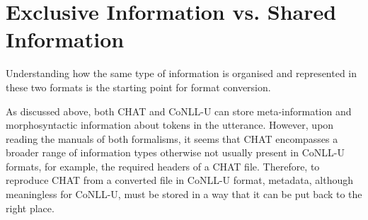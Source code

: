 



\section{Exclusive Information vs. Shared Information}
Understanding how the same type of information is organised and represented in these two formats is the starting point for format conversion.

As discussed above, both CHAT and CoNLL-U can store meta-information and morphosyntactic information about tokens in the utterance. However, upon reading the manuals of both formalisms, it seems that CHAT encompasses a broader range of information types otherwise not usually present in CoNLL-U formats, for example, the required headers of a CHAT file. Therefore, to reproduce CHAT from a converted file in CoNLL-U format, metadata, although meaningless for CoNLL-U, must be stored in a way that it can be put back to the right place.
\clearpage


